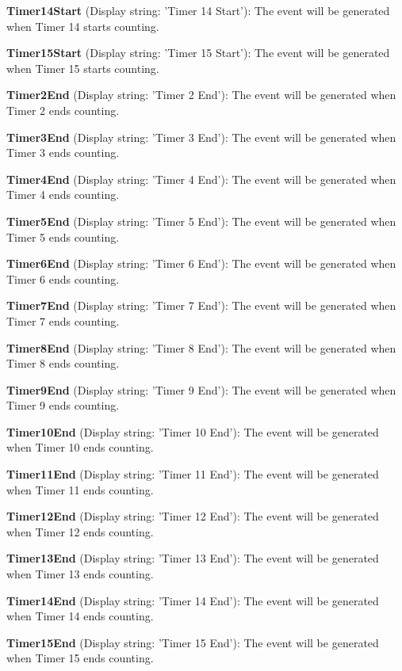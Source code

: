 \begin{DoxyItemize}
\item {\bfseries Timer14\+Start} (Display string\+: 'Timer 14 Start')\+: The event will be generated when Timer 14 starts counting.
\item {\bfseries Timer15\+Start} (Display string\+: 'Timer 15 Start')\+: The event will be generated when Timer 15 starts counting.
\item {\bfseries Timer2\+End} (Display string\+: 'Timer 2 End')\+: The event will be generated when Timer 2 ends counting.
\item {\bfseries Timer3\+End} (Display string\+: 'Timer 3 End')\+: The event will be generated when Timer 3 ends counting.
\item {\bfseries Timer4\+End} (Display string\+: 'Timer 4 End')\+: The event will be generated when Timer 4 ends counting.
\item {\bfseries Timer5\+End} (Display string\+: 'Timer 5 End')\+: The event will be generated when Timer 5 ends counting.
\item {\bfseries Timer6\+End} (Display string\+: 'Timer 6 End')\+: The event will be generated when Timer 6 ends counting.
\item {\bfseries Timer7\+End} (Display string\+: 'Timer 7 End')\+: The event will be generated when Timer 7 ends counting.
\item {\bfseries Timer8\+End} (Display string\+: 'Timer 8 End')\+: The event will be generated when Timer 8 ends counting.
\item {\bfseries Timer9\+End} (Display string\+: 'Timer 9 End')\+: The event will be generated when Timer 9 ends counting.
\item {\bfseries Timer10\+End} (Display string\+: 'Timer 10 End')\+: The event will be generated when Timer 10 ends counting.
\item {\bfseries Timer11\+End} (Display string\+: 'Timer 11 End')\+: The event will be generated when Timer 11 ends counting.
\item {\bfseries Timer12\+End} (Display string\+: 'Timer 12 End')\+: The event will be generated when Timer 12 ends counting.
\item {\bfseries Timer13\+End} (Display string\+: 'Timer 13 End')\+: The event will be generated when Timer 13 ends counting.
\item {\bfseries Timer14\+End} (Display string\+: 'Timer 14 End')\+: The event will be generated when Timer 14 ends counting.
\item {\bfseries Timer15\+End} (Display string\+: 'Timer 15 End')\+: The event will be generated when Timer 15 ends counting.

\end{DoxyItemize}
